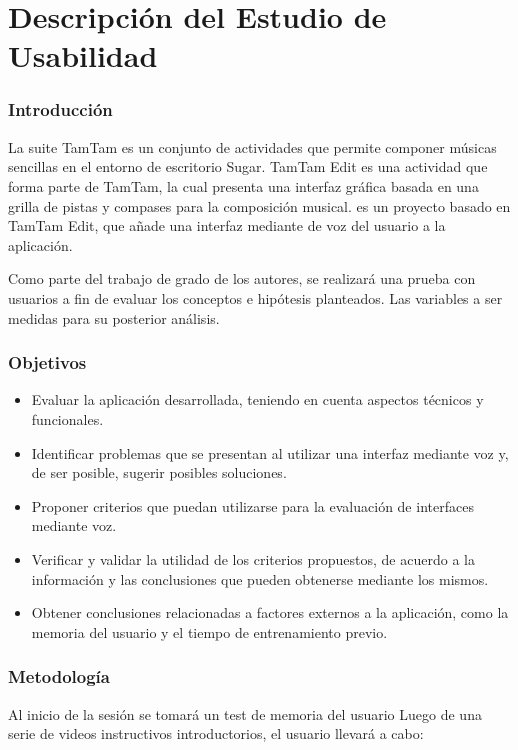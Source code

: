 
\section{Descripci\'on del Estudio de Usabilidad}

\subsubsection{Introducci\'on}

La suite TamTam es un conjunto de actividades que permite componer m\'usicas sencillas en el entorno de 
escritorio Sugar. TamTam Edit es una actividad que forma parte de TamTam, la cual presenta una interfaz 
gr\'afica basada en una grilla de pistas y compases para la composici\'on musical. 
 es un proyecto basado en TamTam Edit, que a\~nade una interfaz mediante de 
voz del usuario a la aplicaci\'on.

Como parte del trabajo de grado de los autores, se realizar\'a una prueba con usuarios a fin de evaluar los conceptos e hip\'otesis planteados. Las variables a ser medidas para su posterior an\'alisis.

\subsubsection{Objetivos}

\begin{itemize}
\item Evaluar la aplicaci\'on desarrollada, teniendo en cuenta aspectos t\'ecnicos y funcionales.
\item Identificar problemas que se presentan al utilizar una interfaz mediante voz y, de ser posible, sugerir posibles soluciones.
\item Proponer criterios que puedan utilizarse para la evaluaci\'on de interfaces mediante voz.
\item Verificar y validar la utilidad de los criterios propuestos, de acuerdo a la informaci\'on y las conclusiones que pueden obtenerse mediante los mismos.
\item Obtener conclusiones relacionadas a factores externos a la aplicaci\'on, como la memoria del usuario y el tiempo de entrenamiento previo.
\end{itemize}

\subsubsection{Metodolog\'ia}
Al inicio de la sesión se tomará un test de memoria del usuario
Luego de una serie de videos instructivos introductorios, el usuario llevar\'a a cabo:


